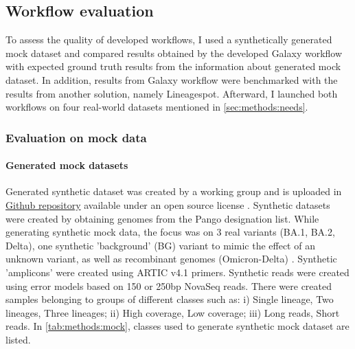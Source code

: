     \subsection{Workflow evaluation} \label{sec:methods:evaluation}
    To assess the quality of developed workflows, I used a synthetically generated mock dataset and compared results obtained by the developed Galaxy workflow with expected ground truth results from the information about generated mock dataset. In addition, results from Galaxy workflow were benchmarked with the results from another solution, namely Lineagespot. Afterward, I launched both workflows on four real-world datasets mentioned in \cref{sec:methods:needs}.
        
        \subsubsection{Evaluation on mock data} \label{sec:methods:evaluation:mock}
            \paragraph{Generated mock datasets}
            Generated synthetic dataset was created by a working group and is uploaded in \href{https://github.com/suskraem/ww_benchmark}{Github repository} available under an open source license \cite{benchmarksamples}. Synthetic datasets were created by obtaining genomes from the Pango designation list. While generating synthetic mock data, the focus was on 3 real variants (BA.1, BA.2, Delta), one synthetic 'background' (BG) variant to mimic the effect of an unknown variant, as well as recombinant genomes (Omicron-Delta) \cite{simonloriere2011,variants}. Synthetic 'amplicons' were created using ARTIC v4.1 primers. Synthetic reads were created using error models based on 150 or 250bp NovaSeq reads. There were created samples belonging to groups of different classes such as: i) Single lineage, Two lineages, Three lineages; ii) High coverage, Low coverage; iii) Long reads, Short reads. In \cref{tab:methods:mock}, classes used to generate synthetic mock dataset are listed.
            
